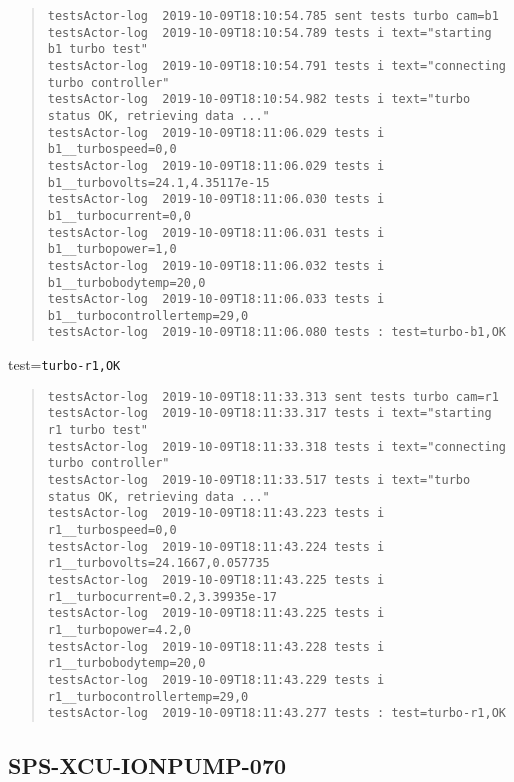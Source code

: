 \begin{quote}
\begin{tiny}
\begin{verbatim}
testsActor-log  2019-10-09T18:10:54.785 sent tests turbo cam=b1
testsActor-log  2019-10-09T18:10:54.789 tests i text="starting b1 turbo test"
testsActor-log  2019-10-09T18:10:54.791 tests i text="connecting turbo controller"
testsActor-log  2019-10-09T18:10:54.982 tests i text="turbo status OK, retrieving data ..."
testsActor-log  2019-10-09T18:11:06.029 tests i b1__turbospeed=0,0
testsActor-log  2019-10-09T18:11:06.029 tests i b1__turbovolts=24.1,4.35117e-15
testsActor-log  2019-10-09T18:11:06.030 tests i b1__turbocurrent=0,0
testsActor-log  2019-10-09T18:11:06.031 tests i b1__turbopower=1,0
testsActor-log  2019-10-09T18:11:06.032 tests i b1__turbobodytemp=20,0
testsActor-log  2019-10-09T18:11:06.033 tests i b1__turbocontrollertemp=29,0
testsActor-log  2019-10-09T18:11:06.080 tests : test=turbo-b1,OK
\end{verbatim}
\end{tiny}
\end{quote}

\noindent test=\texttt{turbo-r1,OK}

\begin{quote}
\begin{tiny}
\begin{verbatim}
testsActor-log  2019-10-09T18:11:33.313 sent tests turbo cam=r1
testsActor-log  2019-10-09T18:11:33.317 tests i text="starting r1 turbo test"
testsActor-log  2019-10-09T18:11:33.318 tests i text="connecting turbo controller"
testsActor-log  2019-10-09T18:11:33.517 tests i text="turbo status OK, retrieving data ..."
testsActor-log  2019-10-09T18:11:43.223 tests i r1__turbospeed=0,0
testsActor-log  2019-10-09T18:11:43.224 tests i r1__turbovolts=24.1667,0.057735
testsActor-log  2019-10-09T18:11:43.225 tests i r1__turbocurrent=0.2,3.39935e-17
testsActor-log  2019-10-09T18:11:43.225 tests i r1__turbopower=4.2,0
testsActor-log  2019-10-09T18:11:43.228 tests i r1__turbobodytemp=20,0
testsActor-log  2019-10-09T18:11:43.229 tests i r1__turbocontrollertemp=29,0
testsActor-log  2019-10-09T18:11:43.277 tests : test=turbo-r1,OK
\end{verbatim}
\end{tiny}
\end{quote}

\subsection{SPS-XCU-IONPUMP-070}
\label{sec:tc-070}

